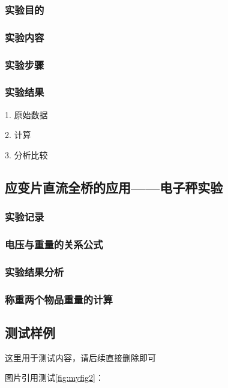 \subsubsection{实验目的}

\subsubsection{实验内容}

\subsubsection{实验步骤}

\subsubsection{实验结果}

1. 原始数据

2. 计算

3. 分析比较

\subsection{应变片直流全桥的应用——电子秤实验}

\subsubsection{实验记录}

\subsubsection{电压与重量的关系公式}

\subsubsection{实验结果分析}

\subsubsection{称重两个物品重量的计算}

\subsection{测试样例}

这里用于测试内容，请后续直接删除即可 

图片引用测试\ref{fig:myfig2}：

